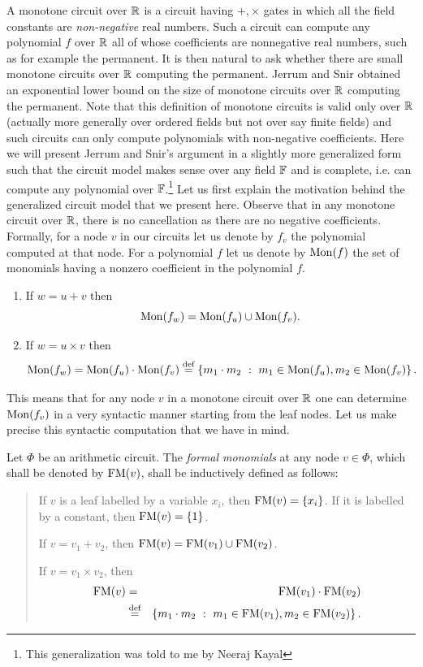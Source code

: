 A monotone circuit over $\mathbb{R}$ is a circuit having $+, \times$ gates in which all the field constants are {\em non-negative} real numbers. 
Such a circuit can compute any polynomial $f$ over $\mathbb{R}$ all of whose coefficients are nonnegative real numbers, such as for example the permanent. 
It is then natural to ask whether there are small monotone circuits over $\mathbb{R}$ computing the permanent. 
Jerrum and Snir \cite{js82} obtained an exponential lower bound on the size of monotone circuits over $\mathbb{R}$ computing the permanent. 
Note that this definition of monotone circuits is valid only over $\mathbb{R}$ (actually more generally over ordered fields but not over say finite fields) and such circuits can only compute polynomials with non-negative coefficients. 
Here we will present Jerrum and Snir's argument in a slightly more generalized form such that the circuit model makes sense over any field $\mathbb{F}$ and is complete, i.e.  can compute any polynomial over $\mathbb{F}$.\footnote{This generalization was told to me by Neeraj Kayal} Let us first explain the motivation behind the generalized circuit model that we present here. 
Observe that in any monotone circuit over $\mathbb{R}$, there is no cancellation as there are no negative coefficients. 
Formally, for a node $v$ in our circuits let us denote by $f_{v}$ the polynomial computed at that node. 
For a polynomial $f$ let us denote by $\mathrm{Mon}(f)$ the set of monomials having a nonzero coefficient in the polynomial $f$.
\begin{enumerate}
\item If $w = u + v$ then 
  $$ \mathrm{Mon}(f_{w}) = \mathrm{Mon}(f_{u}) \cup \mathrm{Mon}(f_{v}). $$
  
\item If $w = u \times v$ then
  $$ \mathrm{Mon}(f_{w}) = \mathrm{Mon}(f_{u}) \cdot \mathrm{Mon}(f_{v}) \stackrel{\text{def}}{=} \left\{{m_1\cdot m_2}\ : \ {m_1 \in \mathrm{Mon}(f_{u}), m_2\in \mathrm{Mon}(f_{v})}\right\}. $$
			
\end{enumerate}
This means that for any node $v$ in a monotone circuit over $\mathbb{R}$ one can determine $\mathrm{Mon}(f_{v})$ in a very syntactic manner starting from the leaf nodes. 
Let us make precise this syntactic computation that we have in mind.

\begin{definition}
  Let $\Phi$ be an arithmetic circuit. 
The \emph{formal monomials} at any node $v\in \Phi$, which shall be denoted by $\mathrm{FM}(v)$, shall be inductively defined as follows:
  \begin{quote}
    If $v$ is a leaf labelled by a variable $x_i$, then $\mathrm{FM}(v) = \left\{x_i\right\}$. 
If it is labelled by a constant, then $\mathrm{FM}(v) = \left\{1\right\}$.
    
    If $v = v_1 + v_2$, then $\mathrm{FM}(v) = \mathrm{FM}(v_1) \cup \mathrm{FM}(v_2)$. 
    
    If $v = v_1 \times v_2$, then 
    \begin{eqnarray*}
      \mathrm{FM}(v) &=& \mathrm{FM}(v_1)\cdot \mathrm{FM}(v_2)\\
      &\stackrel{\text{def}}{=}& \left\{{m_1\cdot m_2}\ : \ {m_1 \in \mathrm{FM}(v_1), m_2\in \mathrm{FM}(v_2)}\right\}.
    \end{eqnarray*}
  \end{quote}
\end{definition}

